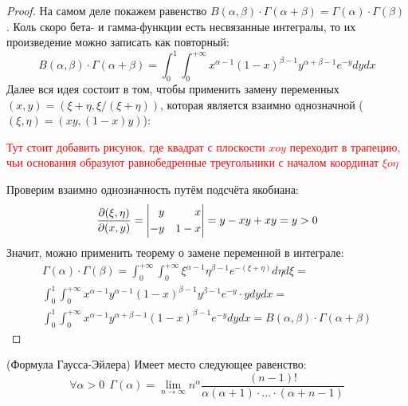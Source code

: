 \begin{proof}
	На самом деле покажем равенство $B(\alpha, \beta) \cdot \Gamma(\alpha + \beta) = \Gamma(\alpha) \cdot \Gamma(\beta)$. Коль скоро бета- и гамма-функции есть несвязанные интегралы, то их произведение можно записать как повторный:
	\[
		B(\alpha, \beta) \cdot \Gamma(\alpha + \beta) = \int_0^1 \int_0^{+\infty} x^{\alpha - 1}(1 - x)^{\beta - 1}y^{\alpha + \beta - 1}e^{-y}dydx
	\]
	Далее вся идея состоит в том, чтобы применить замену переменных $(x, y) = (\xi + \eta, \xi / (\xi + \eta))$, которая является взаимно однозначной ($(\xi, \eta) = (xy, (1 - x)y)$):
	
	\textcolor{red}{Тут стоит добавить рисунок, где квадрат с плоскости $xoy$ переходит в трапецию, чьи основания образуют равнобедренные треугольники с началом координат $\xi o \eta$}
	
	Проверим взаимно однозначность путём подсчёта якобиана:
	\[
		\frac{\partial (\xi, \eta)}{\partial (x, y)} = \left| \begin{aligned} 
			y& &x
			\\
			-y& &1 - x
		 \end{aligned} \right| = y - xy + xy = y > 0
	\]
	Значит, можно применить теорему о замене переменной в интеграле:
	\begin{multline*}
		\Gamma(\alpha) \cdot \Gamma(\beta) = \int_0^{+\infty} \int_0^{+\infty} \xi^{\alpha - 1} \eta^{\beta - 1} e^{-(\xi + \eta)}d\eta d\xi =
		\\
		\int_0^1 \int_0^{+\infty} x^{\alpha - 1} y^{\alpha - 1} (1 - x)^{\beta - 1} y^{\beta - 1} e^{-y} \cdot ydydx =
		\\
		\int_0^1 \int_0^{+\infty} x^{\alpha - 1} y^{\alpha + \beta - 1} (1 - x)^{\beta - 1} e^{-y} dydx = B(\alpha, \beta) \cdot \Gamma(\alpha + \beta)
	\end{multline*}
\end{proof}

\begin{theorem} (Формула Гаусса-Эйлера)
	Имеет место следующее равенство:
	\[
		\forall \alpha > 0\ \ \Gamma(\alpha) = \lim_{n \to \infty} n^\alpha \frac{(n - 1)!}{\alpha(\alpha + 1) \cdot \ldots \cdot (\alpha + n - 1)}
	\]
\end{theorem}

